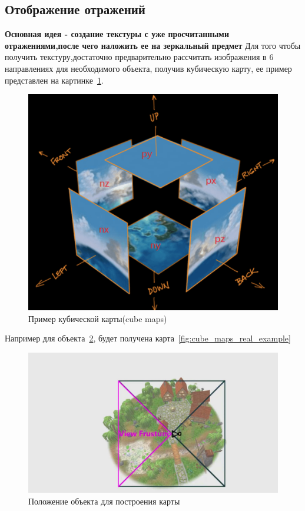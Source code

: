 \documentclass[a4paper,14pt,unknownkeysallowed]{extreport}
\begin{document}
\subsection{Отображение отражений}
\textbf{Основная идея - создание текстуры с уже просчитанными отражениями,после чего наложить ее на зеркальный предмет} \newline
Для того чтобы получить текстуру,достаточно предварительно рассчитать изображения в 6 направлениях для необходимого объекта, получив кубическую карту, ее пример представлен на картинке~\ref{fig:cube_maps}.\cite{reflexion_types}
\begin{figure}[h]
	\centering
	\includegraphics[scale=0.4]{cube_maps}
	\caption{Пример кубической карты(cube maps)}
	\label{fig:cube_maps}
\end{figure}

Например для объекта~\ref{fig:cube_maps_real}, будет получена карта~\ref{fig:cube_maps_real_example}


\begin{figure}[H]
	\centering
	\includegraphics[scale=0.4]{cube_maps_real}
	\caption{Положение объекта для построения карты}
	\label{fig:cube_maps_real}
\end{figure}
\end{document}
